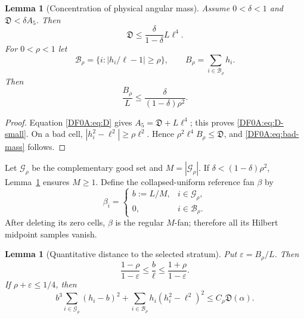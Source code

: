 \documentclass[11pt]{amsart}
\numberwithin{equation}{section}
\newtheorem{lemma}[theorem]{Lemma}
\theoremstyle{definition}
\theoremstyle{remark}
\begin{document}
\begin{lemma}[Concentration of physical angular mass]
\label{DF0A:lem:concentration}
Assume $0<\delta<1$ and
$\mathfrak D<\delta A_5$.  Then
\begin{equation}\label{DF0A:eq:D-small}
 \mathfrak D\le\frac{\delta}{1-\delta}L\ell^4.
\end{equation}
For $0<\rho<1$ let
\begin{equation}\label{DF0A:eq:bad}
 \mathcal B_\rho=\{i:|h_i/\ell-1|\ge\rho\},
 \qquad B_\rho=\sum_{i\in\mathcal B_\rho}h_i.
\end{equation}
Then
\begin{equation}\label{DF0A:eq:bad-mass}
 \boxed{
 \frac{B_\rho}{L}
 \le\frac{\delta}{(1-\delta)\rho^2}.}
\end{equation}
\end{lemma}

\begin{proof}
Equation \eqref{DF0A:eq:D} gives $A_5=\mathfrak D+L\ell^4$;
this proves \eqref{DF0A:eq:D-small}.  On a bad cell,
$|h_i^2-\ell^2|\ge\rho\ell^2$.  Hence
$\rho^2\ell^4B_\rho\le\mathfrak D$, and
\eqref{DF0A:eq:bad-mass} follows.
\end{proof}

Let $\mathcal G_\rho$ be the complementary good set and
$M=|\mathcal G_\rho|$.  If
$\delta<(1-\delta)\rho^2$, Lemma~\ref{DF0A:lem:concentration} ensures
$M\ge1$.  Define the collapsed-uniform reference fan $\beta$ by
\begin{equation}\label{DF0A:eq:beta}
 \beta_i=\begin{cases}b:=L/M,&i\in\mathcal G_\rho,\\0,&i\in\mathcal B_\rho.
 \end{cases}
\end{equation}
After deleting its zero cells, $\beta$ is the regular $M$-fan; therefore
all its Hilbert midpoint samples vanish.

\begin{lemma}[Quantitative distance to the selected stratum]
\label{DF0A:lem:reference}
Put $\varepsilon=B_\rho/L$.  Then
\begin{equation}\label{DF0A:eq:b-ell}
 \frac{1-\rho}{1-\varepsilon}
 \le\frac b\ell\le
 \frac{1+\rho}{1-\varepsilon}.
\end{equation}
If $\rho+\varepsilon\le1/4$, then
\begin{equation}\label{DF0A:eq:reference-charge}
 \boxed{
 b^3\sum_{i\in\mathcal G_\rho}(h_i-b)^2
 +\sum_{i\in\mathcal B_\rho}h_i(h_i^2-\ell^2)^2
 \le C_\rho\mathfrak D(\alpha).}
\end{equation}
\end{lemma}
\end{document}
